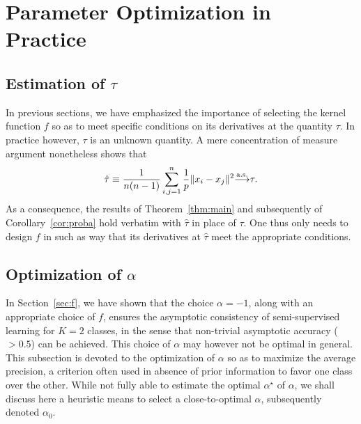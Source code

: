 \documentclass[twoside,11pt]{article}
\def\asto{ {\overset{\rm a.s.}{\longrightarrow}} }
\begin{document}
\section{Parameter Optimization in Practice}

\subsection{Estimation of $\tau$}
\label{subsec:estimation-tau}
In previous sections, we have emphasized the importance of selecting the kernel function $f$ so as to meet specific conditions on its derivatives at the quantity $\tau$. In practice however, $\tau$ is an unknown quantity. A mere concentration of measure argument nonetheless shows that 
\begin{align}
	\label{eq:hattau}
	\hat\tau \equiv \frac1{n(n-1)}\sum_{i,j=1}^n \frac1p\|x_i-x_j\|^2 \asto \tau.
\end{align}
As a consequence, the results of Theorem~\ref{thm:main} and subsequently of Corollary~\ref{cor:proba} hold verbatim with $\hat\tau$ in place of $\tau$. One thus only needs to design $f$ in such as way that its derivatives at $\hat\tau$ meet the appropriate conditions.


\subsection{Optimization of $\alpha$}

In Section~\ref{sec:f}, we have shown that the choice $\alpha=-1$, along with an appropriate choice of $f$, ensures the asymptotic consistency of semi-supervised learning for $K=2$ classes, in the sense that non-trivial asymptotic accuracy ($>0.5$) can be achieved. This choice of $\alpha$ may however not be optimal in general. This subsection is devoted to the optimization of $\alpha$ so as to maximize the average precision, a criterion often used in absence of prior information to favor one class over the other. While not fully able to estimate the optimal $\alpha^\star$ of $\alpha$, we shall discuss here a heuristic means to select a close-to-optimal $\alpha$, subsequently denoted $\alpha_0$.
\end{document}
